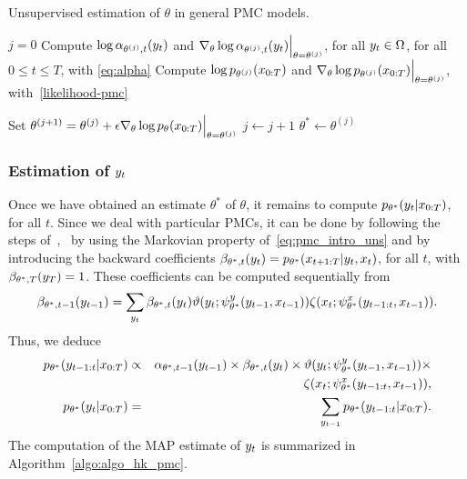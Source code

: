 \begin{algorithm}[htbp!]
  \caption{Unsupervised estimation of $\theta$ in general PMC models.}
  \label{algo:algo_theta_pmc}
  \begin{algorithmic}[1]
  \State  $j=0$\label{line:start_dpmc}
  \State  Compute $\log\alpha_{\theta^{(j)},t}(y_t)$ and $\nabla_{\theta}\log\alpha_{\theta^{(j)},t}(y_t)\Big|_{\theta=\theta^{(j)}}$, for all $y_t \in \Omega$, 
  for all $0 \leq t \leq T$, with \eqref{eq:alpha}
  \State Compute $\log p_{\theta^{(j)}}(x_{0:T})$ and $\nabla_{\theta}\log p_{\theta^{(j)}}(x_{0:T})\Big|_{\theta=\theta^{(j)}}$, with~\eqref{likelihood-pmc}

  \State Set $\theta^{(j+1)}=\theta^{(j)} + \epsilon {\nabla_{\theta} \log{p_{\theta}(x_{0:T})}}\Big|_{\theta=\theta^{(j)}}$\label{update-GEM} 
  \State $j\leftarrow j+1$
  \EndWhile
  \State  $\theta^{*} \leftarrow \theta^{(j)}$
\end{algorithmic}
\end{algorithm}


\subsubsection{Estimation of $y_t$}
Once we have obtained an estimate $\theta^*$ of $\theta$, it remains to compute
$p_{\theta^*}(y_t|x_{0:T})$, for all $t$. Since we deal with particular PMCs, it
can be done by following the steps of~\citet{pieczynski2003pairwise}, \ie~by
using the Markovian property of~\eqref{eq:pmc_intro_uns} 
and by introducing the
backward coefficients
$\beta_{\theta^*,t}(y_t)= p_{\theta^*}(x_{t+1:T}|y_t,x_t)$, for all $t$,
with $\beta_{\theta^*,T}(y_{T})=1$.
These coefficients can be computed sequentially from
\begin{equation}
\label{eq:beta}
\beta_{\theta^*,t-1}(y_{t-1})= 
\sum_{y_{t}} \beta_{\theta^*,t}(y_{t})
\vartheta(y_t;\psi^{y}_{\theta^*}(y_{t-1},x_{t-1})) 
\zeta(x_t;\psi^{x}_{\theta^*}(y_{t-1:t},x_{t-1})) \text{.}
\end{equation}
Thus, we deduce
\begin{eqnarray}
\label{eq:pair_post_margin}
p_{\theta^*}(y_{t-1:t}|x_{0:T}) &\propto&
\alpha_{\theta^*,t-1}(y_{t-1}) \times  \beta_{\theta^*,t}(y_t) \times
\vartheta(y_t;\psi^{y}_{\theta^*}(y_{t-1},x_{t-1})) \times \nonumber\\
&&  \;\;  \zeta(x_t;\psi^{x}_{\theta^*}(y_{t-1:t},x_{t-1}))   \text{,} \\
\label{eq:post_margin}
p_{\theta^*}(y_t|x_{0:T})&=&\sum_{y_{t-1}} p_{\theta^*}(y_{t-1:t}|x_{0:T}).
\end{eqnarray}
The computation of the MAP estimate
of $y_t$ is summarized in Algorithm~\ref{algo:algo_hk_pmc}.



